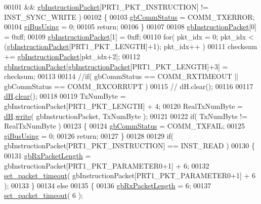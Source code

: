 \begin{DoxyCode}
00101         && \hyperlink{a00003_afd94dcf01b8e96298727776e222de722}{gbInstructionPacket}[PRT1\_PKT\_INSTRUCTION] != INST\_SYNC\_WRITE )
00102     \{
00103         \hyperlink{a00003_a5b603f6bed7ccc595f1f50bd6a6ebbfc}{gbCommStatus} = COMM\_TXERROR;
00104         \hyperlink{a00003_ad10e0e49f5fef04bf789a89c14cc470a}{giBusUsing} = 0;
00105         \textcolor{keywordflow}{return};
00106     \}
00107     
00108     \hyperlink{a00003_afd94dcf01b8e96298727776e222de722}{gbInstructionPacket}[0] = 0xff;
00109     \hyperlink{a00003_afd94dcf01b8e96298727776e222de722}{gbInstructionPacket}[1] = 0xff;
00110     \textcolor{keywordflow}{for}( pkt\_idx = 0; pkt\_idx < (\hyperlink{a00003_afd94dcf01b8e96298727776e222de722}{gbInstructionPacket}[PRT1\_PKT\_LENGTH]+1); pkt\_idx++ )
00111         checksum += \hyperlink{a00003_afd94dcf01b8e96298727776e222de722}{gbInstructionPacket}[pkt\_idx+2];
00112     \hyperlink{a00003_afd94dcf01b8e96298727776e222de722}{gbInstructionPacket}[\hyperlink{a00003_afd94dcf01b8e96298727776e222de722}{gbInstructionPacket}[PRT1\_PKT\_LENGTH]+3] = ~
      checksum;
00113     
00114     \textcolor{comment}{//if( gbCommStatus == COMM\_RXTIMEOUT || gbCommStatus == COMM\_RXCORRUPT )}
00115     \textcolor{comment}{//  dH.clear();}
00116 
00117     \hyperlink{a00003_ae003cc90ada6d7b70eaa4ea9d42d4deb}{dH}.\hyperlink{a00002_a004eedde5af69219d7288ec8ea97c89f}{clear}();
00118 
00119     TxNumByte = gbInstructionPacket[PRT1\_PKT\_LENGTH] + 4;
00120     RealTxNumByte = \hyperlink{a00003_ae003cc90ada6d7b70eaa4ea9d42d4deb}{dH}.\hyperlink{a00002_a90106970438fb0ab65852730a1c0776a}{write}( gbInstructionPacket, TxNumByte );
00121 
00122     \textcolor{keywordflow}{if}( TxNumByte != RealTxNumByte )
00123     \{
00124         \hyperlink{a00003_a5b603f6bed7ccc595f1f50bd6a6ebbfc}{gbCommStatus} = COMM\_TXFAIL;
00125         \hyperlink{a00003_ad10e0e49f5fef04bf789a89c14cc470a}{giBusUsing} = 0;
00126         \textcolor{keywordflow}{return};
00127     \}
00128 
00129     \textcolor{keywordflow}{if}( gbInstructionPacket[PRT1\_PKT\_INSTRUCTION] == INST\_READ )
00130     \{
00131         \hyperlink{a00003_a333686e1b5903d16c41df8172b6bd5a8}{gbRxPacketLength} =  gbInstructionPacket[PRT1\_PKT\_PARAMETER0+1] + 6;
00132         \hyperlink{a00003_a067f82c21ed176e18fa224d16f3d1c5b}{set\_packet\_timeout}( gbInstructionPacket[PRT1\_PKT\_PARAMETER0+1] + 6 );
00133     \}
00134     \textcolor{keywordflow}{else}
00135     \{
00136         \hyperlink{a00003_a333686e1b5903d16c41df8172b6bd5a8}{gbRxPacketLength} = 6;
00137         \hyperlink{a00003_a067f82c21ed176e18fa224d16f3d1c5b}{set\_packet\_timeout}( 6 );

\end{DoxyCode}

